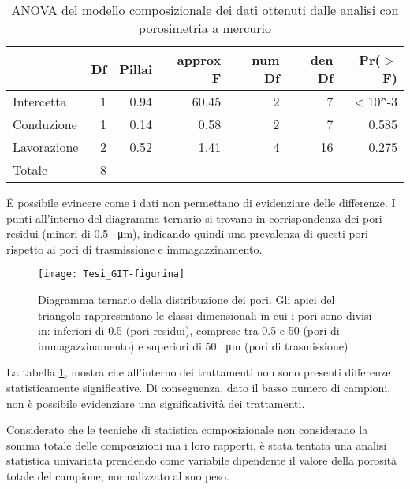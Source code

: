 \documentclass[a4paper]{article}
\begin{document}
\begin{table}[ht]
\centering
\caption{ANOVA del modello composizionale dei dati ottenuti dalle analisi con porosimetria a mercurio } 
\label{tab:poros_anova}
\begin{tabular}{lrrrrrr}
  \hline
 & Df & Pillai & approx F & num Df & den Df & Pr($>$F) \\ 
  \hline
Intercetta & 1 & 0.94 & 60.45 & 2 & 7 & $<$10\verb|^|-3 \\ 
  Conduzione & 1 & 0.14 & 0.58 & 2 & 7 & 0.585 \\ 
  Lavorazione & 2 & 0.52 & 1.41 & 4 & 16 & 0.275 \\ 
  Totale & 8 &  &  &  &  &  \\ 
   \hline
\end{tabular}
\end{table}
\`E possibile evincere come i dati non permettano di evidenziare delle
differenze. I punti all'interno del diagramma ternario si trovano in
corrispondenza dei pori residui (minori di
0.5 \SI{}{\micro\metre}), indicando quindi una
prevalenza di questi pori rispetto ai pori di trasmissione e immagazzinamento.

 
\begin{figure}[ht]
  \centering
\texttt{[image: Tesi\_GIT-figurina]}
  \caption[didascalia corta]{Diagramma ternario della distribuzione dei
    pori. Gli apici del triangolo rappresentano le classi dimensionali
    in cui i pori sono divisi in: inferiori di
    0.5 (pori residui), comprese tra
    0.5 e 50 (pori di immagazzinamento)
    e superiori di 50 \SI{}{\micro\metre}
    (pori di trasmissione)}
  \label{fig:Poros_triangolo}
\end{figure}
\FloatBarrier

La tabella \ref{tab:poros_anova}, mostra che all'interno dei
trattamenti non sono presenti differenze statisticamente
significative. Di conseguenza, dato il basso numero di campioni, non
\`e possibile evidenziare una significatività dei trattamenti.

Considerato che le tecniche di statistica composizionale non
considerano la somma totale delle composizioni ma i loro rapporti, \`e
stata tentata una analisi statistica univariata prendendo come
variabile dipendente il valore della porosità totale del campione,
normalizzato al suo peso.
\end{document}
